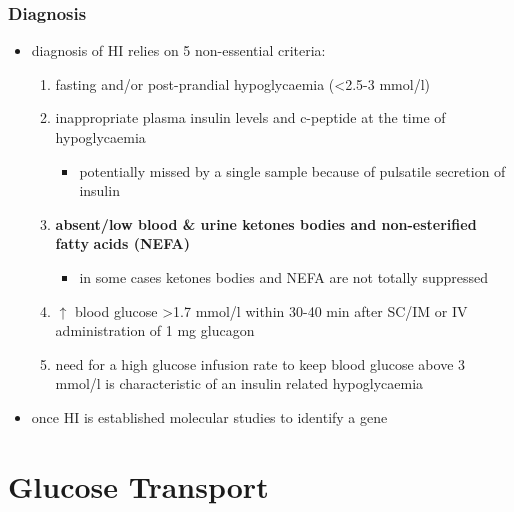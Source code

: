 \documentclass{scrartcl}
\begin{document}
\subsubsection{Diagnosis}
\label{sec:org1448b51}
\begin{itemize}
\item diagnosis of HI relies on 5 non-essential criteria:
\begin{enumerate}
\item fasting and/or post-prandial hypoglycaemia (\textless{}2.5-3 mmol/l)
\item inappropriate plasma insulin levels and c-peptide at the time of
hypoglycaemia
\begin{itemize}
\item potentially missed by a single sample because of pulsatile
secretion of insulin
\end{itemize}
\item \textbf{absent/low blood \& urine ketones bodies and non-esterified fatty}
\textbf{acids (NEFA)}
\begin{itemize}
\item in some cases ketones bodies and NEFA are not totally
suppressed
\end{itemize}
\item \(\uparrow\) blood glucose \textgreater{}1.7 mmol/l within 30-40 min after
SC/IM or IV administration of 1 mg glucagon
\item need for a high glucose infusion rate to keep blood
glucose above 3 mmol/l is characteristic of an insulin related
hypoglycaemia
\end{enumerate}

\item once HI is established molecular studies to identify a gene
\end{itemize}
\section{Glucose Transport}
\label{sec:orgbb0884f}
\end{document}
